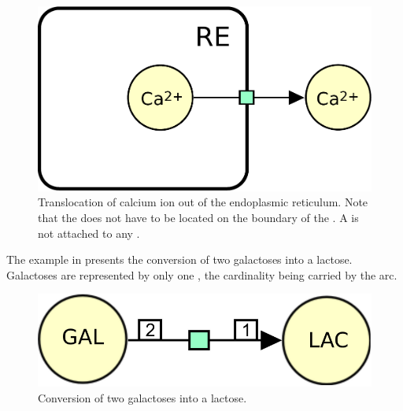 \begin{figure}[H]
  \centering
  \includegraphics[scale = 0.5]{images/process-translocation}
  \caption{Translocation of calcium ion out of the endoplasmic reticulum. Note that the  does not have to be located on the boundary of the . A  is not attached to any .}
  \label{fig:trans-trans}
\end{figure}

The example in  presents the conversion of two galactoses into a lactose.  Galactoses are represented by only one , the cardinality being carried by the  arc.

\begin{figure}[H]
  \centering
  \includegraphics[scale = 0.5]{images/process-dimerisation}
  \caption{Conversion of two galactoses into a lactose.}
  \label{fig:trans-dim}
\end{figure}

